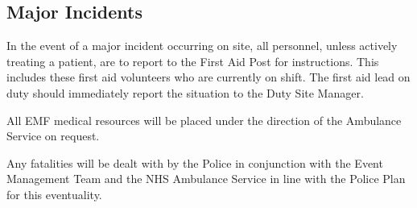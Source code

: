 \subsection{Major Incidents}

In the event of a major incident occurring on site, all personnel, unless
actively treating a patient, are to report to the First Aid Post for
instructions. This includes these first aid volunteers who are currently on
shift. The first aid lead on duty should immediately report the situation to the
Duty Site Manager.

All EMF medical resources will be placed under the direction of the Ambulance
Service on request.

Any fatalities will be dealt with by the Police in conjunction with the Event
Management Team and the NHS Ambulance Service in line with the Police Plan for
this eventuality.
